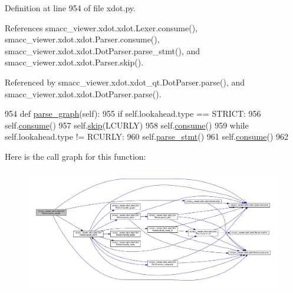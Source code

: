 Definition at line 954 of file xdot.\+py.



References smacc\+\_\+viewer.\+xdot.\+xdot.\+Lexer.\+consume(), smacc\+\_\+viewer.\+xdot.\+xdot.\+Parser.\+consume(), smacc\+\_\+viewer.\+xdot.\+xdot.\+Dot\+Parser.\+parse\+\_\+stmt(), and smacc\+\_\+viewer.\+xdot.\+xdot.\+Parser.\+skip().



Referenced by smacc\+\_\+viewer.\+xdot.\+xdot\+\_\+qt.\+Dot\+Parser.\+parse(), and smacc\+\_\+viewer.\+xdot.\+xdot.\+Dot\+Parser.\+parse().


\begin{DoxyCode}
954     \textcolor{keyword}{def }\hyperlink{classsmacc__viewer_1_1xdot_1_1xdot_1_1DotParser_ad807f583875318fe8d5c2304360459ef}{parse\_graph}(self):
955         \textcolor{keywordflow}{if} self.lookahead.type == STRICT:
956             self.\hyperlink{classsmacc__viewer_1_1xdot_1_1xdot_1_1Parser_ab70715898a2ec0b51c6b333b73c78c37}{consume}()
957         self.\hyperlink{classsmacc__viewer_1_1xdot_1_1xdot_1_1Parser_ab6641c5df2047b92e65244eba82cb75d}{skip}(LCURLY)
958         self.\hyperlink{classsmacc__viewer_1_1xdot_1_1xdot_1_1Parser_ab70715898a2ec0b51c6b333b73c78c37}{consume}()
959         \textcolor{keywordflow}{while} self.lookahead.type != RCURLY:
960             self.\hyperlink{classsmacc__viewer_1_1xdot_1_1xdot_1_1DotParser_ab0abf8209a36d81e162b0dc2a0b94d54}{parse\_stmt}()
961         self.\hyperlink{classsmacc__viewer_1_1xdot_1_1xdot_1_1Parser_ab70715898a2ec0b51c6b333b73c78c37}{consume}()
962 
\end{DoxyCode}


Here is the call graph for this function\+:
\nopagebreak
\begin{figure}[H]
\begin{center}
\leavevmode
\includegraphics[width=350pt]{classsmacc__viewer_1_1xdot_1_1xdot_1_1DotParser_ad807f583875318fe8d5c2304360459ef_cgraph}
\end{center}
\end{figure}




